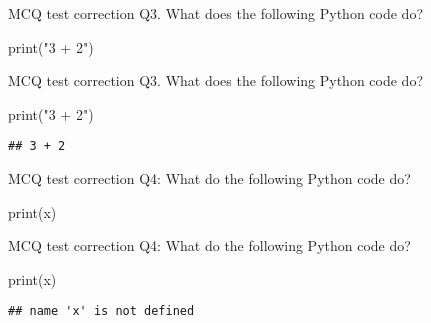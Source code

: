 \documentclass[
  8pt,
  ignorenonframetext,
]{beamer}
\newenvironment{Shaded}{\begin{snugshade}}{\end{snugshade}}
\newcommand{\BuiltInTok}[1]{#1}
\newcommand{\NormalTok}[1]{#1}
\newcommand{\StringTok}[1]{\textcolor[rgb]{0.31,0.60,0.02}{#1}}
\begin{document}
\begin{frame}[fragile]{MCQ test correction}
\protect\hypertarget{mcq-test-correction-4}{}
Q3. What does the following Python code do?

\begin{Shaded}
\begin{Highlighting}[]
\BuiltInTok{print}\NormalTok{(}\StringTok{"3 + 2"}\NormalTok{)}
\end{Highlighting}
\end{Shaded}
\end{frame}

\begin{frame}[fragile]{MCQ test correction}
\protect\hypertarget{mcq-test-correction-5}{}
Q3. What does the following Python code do?

\begin{Shaded}
\begin{Highlighting}[]
\BuiltInTok{print}\NormalTok{(}\StringTok{"3 + 2"}\NormalTok{)}
\end{Highlighting}
\end{Shaded}

\begin{verbatim}
## 3 + 2
\end{verbatim}
\end{frame}

\begin{frame}[fragile]{MCQ test correction}
\protect\hypertarget{mcq-test-correction-6}{}
Q4: What do the following Python code do?

\begin{Shaded}
\begin{Highlighting}[]
\BuiltInTok{print}\NormalTok{(x)}
\end{Highlighting}
\end{Shaded}
\end{frame}

\begin{frame}[fragile]{MCQ test correction}
\protect\hypertarget{mcq-test-correction-7}{}
Q4: What do the following Python code do?

\begin{Shaded}
\begin{Highlighting}[]
\BuiltInTok{print}\NormalTok{(x)}
\end{Highlighting}
\end{Shaded}

\begin{verbatim}
## name 'x' is not defined
\end{verbatim}
\end{frame}
\end{document}
